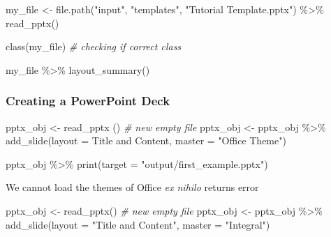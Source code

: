 \documentclass[
]{book}
\newenvironment{Shaded}{\begin{snugshade}}{\end{snugshade}}
\newcommand{\AttributeTok}[1]{\textcolor[rgb]{0.77,0.63,0.00}{#1}}
\newcommand{\CommentTok}[1]{\textcolor[rgb]{0.56,0.35,0.01}{\textit{#1}}}
\newcommand{\FunctionTok}[1]{\textcolor[rgb]{0.00,0.00,0.00}{#1}}
\newcommand{\NormalTok}[1]{#1}
\newcommand{\OtherTok}[1]{\textcolor[rgb]{0.56,0.35,0.01}{#1}}
\newcommand{\SpecialCharTok}[1]{\textcolor[rgb]{0.00,0.00,0.00}{#1}}
\newcommand{\StringTok}[1]{\textcolor[rgb]{0.31,0.60,0.02}{#1}}
\begin{document}
\begin{Shaded}
\begin{Highlighting}[]
\NormalTok{my\_file }\OtherTok{\textless{}{-}} \FunctionTok{file.path}\NormalTok{(}\StringTok{"input"}\NormalTok{, }\StringTok{"templates"}\NormalTok{, }\StringTok{"Tutorial Template.pptx"}\NormalTok{) }\SpecialCharTok{\%\textgreater{}\%} 
                        \FunctionTok{read\_pptx}\NormalTok{()}

\FunctionTok{class}\NormalTok{(my\_file) }\CommentTok{\# checking if correct class}

\NormalTok{my\_file }\SpecialCharTok{\%\textgreater{}\%}
  \FunctionTok{layout\_summary}\NormalTok{()}
\end{Highlighting}
\end{Shaded}

\hypertarget{creating-a-powerpoint-deck}{%
\subsubsection{Creating a PowerPoint Deck}\label{creating-a-powerpoint-deck}}

\begin{Shaded}
\begin{Highlighting}[]
\NormalTok{pptx\_obj }\OtherTok{\textless{}{-}} \FunctionTok{read\_pptx}\NormalTok{ () }\CommentTok{\# new empty file}
\NormalTok{pptx\_obj }\OtherTok{\textless{}{-}}\NormalTok{ pptx\_obj }\SpecialCharTok{\%\textgreater{}\%} 
  \FunctionTok{add\_slide}\NormalTok{(}\AttributeTok{layout  =} \StringTok{\textquotesingle{}Title and Content\textquotesingle{}}\NormalTok{, }\AttributeTok{master =} \StringTok{"Office Theme"}\NormalTok{)}

\NormalTok{pptx\_obj }\SpecialCharTok{\%\textgreater{}\%} \FunctionTok{print}\NormalTok{(}\AttributeTok{target =} \StringTok{"output/first\_example.pptx"}\NormalTok{)}
\end{Highlighting}
\end{Shaded}

We cannot load the themes of Office \emph{ex nihilo} returns error

\begin{Shaded}
\begin{Highlighting}[]
\NormalTok{pptx\_obj }\OtherTok{\textless{}{-}} \FunctionTok{read\_pptx}\NormalTok{() }\CommentTok{\# new empty file}
\NormalTok{pptx\_obj }\OtherTok{\textless{}{-}}\NormalTok{ pptx\_obj }\SpecialCharTok{\%\textgreater{}\%} 
  \FunctionTok{add\_slide}\NormalTok{(}\AttributeTok{layout =} \StringTok{"Title and Content"}\NormalTok{, }\AttributeTok{master =} \StringTok{"Integral"}\NormalTok{)}
\end{Highlighting}
\end{Shaded}
\end{document}
